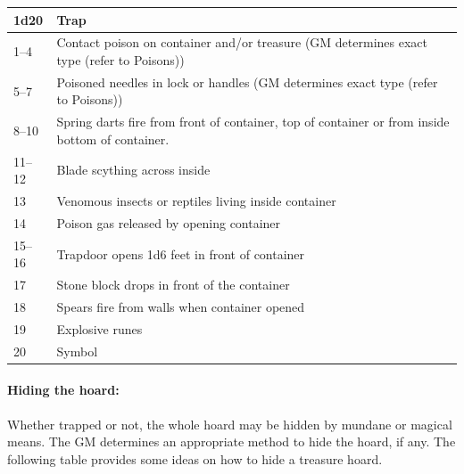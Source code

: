 \begin{multicols}{2}
\begin{minipage}{\columnwidth}
\label{treasuretraps}
\noindent
\begin{tabular}{|p{}|p{}|}
\hline
1d20	& Trap \\
\hline\hline
\rowcolor[gray]{.9}1--4	& Contact poison on container and/or treasure (GM determines exact type (refer to Poisons)) \\
5--7	& Poisoned needles in lock or handles (GM determines exact type (refer to Poisons)) \\
\rowcolor[gray]{.9}8--10	& Spring darts fire from front of container, top of container or from inside bottom of container. \\
11--12	& Blade scything across inside \\
\rowcolor[gray]{.9}13	& Venomous insects or reptiles living inside container \\
14	& Poison gas released by opening container \\
\rowcolor[gray]{.9}15--16	& Trapdoor opens 1d6 feet in front of container \\
17	& Stone block drops in front of the container \\
\rowcolor[gray]{.9}18	& Spears fire from walls when container opened \\
19	& Explosive runes \\
\rowcolor[gray]{.9}20	& Symbol \\
\hline
\end{tabular}

\end{minipage}

\paragraph{Hiding the hoard:} Whether trapped or not, the whole hoard may be hidden by mundane or magical means.  The GM determines an appropriate method to hide the hoard, if any.  The following table provides some ideas on how to hide a treasure hoard.

\noindent
\begin{minipage}{\columnwidth}


\end{minipage}
\end{multicols}
